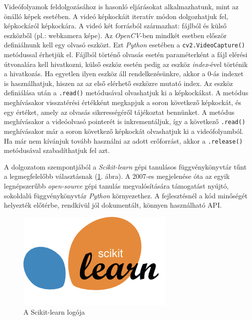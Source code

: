 Videófolyamok feldolgozásához is hasonló eljárásokat alkalmazhatunk, mint az önálló képek esetében. A videó képkockáit iteratív módon dolgozhatjuk fel, képkockáról képkockára. A videó két forrásból származhat: fájlból és külső eszközből (pl.: webkamera képe). Az \textit{OpenCV}-ben mindkét esetben először definiálnunk kell egy olvasó eszközt. Ezt \textit{Python} esetében a \texttt{cv2.VideoCapture()} metódussal érhetjük el. Fájlból történő olvasás esetén paraméterként a fájl elérési útvonalára kell hivatkozni, külső eszköz esetén pedig az eszköz \textit{index}-ével történik a hivatkozás. Ha egyetlen ilyen eszköz áll rendelkezésünkre, akkor a 0-ás indexet is használhatjuk, hiszen az az első elérhető eszközre mutató index.
Az eszköz definiálása után a \texttt{.read()} metódusával olvashatjuk ki a képkockákat. A metódus meghívásakor visszatérési értékként megkapjuk a soron következő képkockát, és egy értéket, amely az olvasás sikerességéről tájékoztat bennünket. A metódus meghívásakor a videóolvasó pointerét is inkrementáljuk, így a következő \texttt{.read()} meghívásakor már a soron következő képkockát olvashatjuk ki a videófolyamból. Ha már nem kívánjuk tovább használni az adott erőforrást, akkor a \texttt{.release()} metódusával szabadíthatjuk fel azt.


A dolgozatom szempontjából a \textit{Scikit-learn} gépi tanulásos függvénykönyvtár tűnt a legmegfelelőbb választásnak (\ref{fig:scikit}. ábra). A 2007-es megjelenése óta az egyik legnépszerűbb \textit{open-source} gépi tanulás megvalósítására támogatást nyújtó, sokoldalú függvénykönyvtár \textit{Python} környezethez. A fejlesztésnél a kód minőségét helyezték előtérbe, rendkívül jól dokumentált, könnyen használható API.

\begin{figure}[h]
\centering
\includegraphics[width=4.76truecm, height=2.96truecm]{images/scikit-learn-logo.png}
\caption{A Scikit-learn logója}
\label{fig:scikit}
\end{figure}

